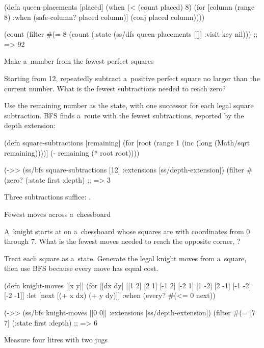 {(defn queen-placements [placed]
  (when (< (count placed) 8)
    (for [column (range 8)
          :when (safe-column? placed column)]
      (conj placed column))))

(count (filter #(= 8 (count (:state %
               (ss/dfs queen-placements [[]] {:visit-key nil})))
;; => 92
\endtt

\secc Make a~number from the fewest perfect squares

 Starting from 12, repeatedly subtract a~positive
perfect square no larger than the current number. What is the fewest
subtractions needed to reach zero?

\smallskip
{} Use the remaining number as the state, with one
successor for each legal square subtraction. BFS finds a~route with the
fewest subtractions, reported by the depth extension:

\begtt {}
(defn square-subtractions [remaining]
  (for [root (range 1 (inc (long (Math/sqrt remaining))))]
    (- remaining (* root root))))

(->> (ss/bfs square-subtractions [12]
                 {:extensions [ss/depth-extension]})
     (filter #(zero? (:state %
     first
     :depth)
;; => 3
\endtt

Three subtractions suffice: .

\secc Fewest moves across a~chessboard

 A~knight
starts at \code{[0 0]} on a~chessboard
whose squares are \code{[x y]} with coordinates from 0 through 7.
What is the fewest moves needed to reach the opposite corner,
\code{[7 7]}?

\smallskip
{} Treat each square as a~state. Generate the legal
knight moves from a~square, then use BFS because every move has equal cost.

\begtt {}
(defn knight-moves [[x y]]
  (for [[dx dy] [[1 2] [2 1] [-1 2] [-2 1]
                 [1 -2] [2 -1] [-1 -2] [-2 -1]]
        :let [next [(+ x dx) (+ y dy)]]
        :when (every? #(<= 0 %
    next))

(->> (ss/bfs knight-moves [[0 0]]
                 {:extensions [ss/depth-extension]})
     (filter #(= [7 7] (:state %
     first
     :depth)
;; => 6
\endtt

 Measure four litres with two jugs

}
